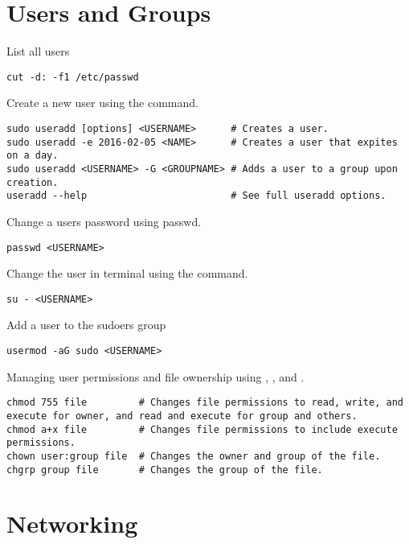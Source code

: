 \section{Users and Groups}

List all users
\begin{lstlisting}
cut -d: -f1 /etc/passwd
\end{lstlisting}

Create a new user using the  command.
\begin{lstlisting}
sudo useradd [options] <USERNAME>      # Creates a user.
sudo useradd -e 2016-02-05 <NAME>      # Creates a user that expites on a day.
sudo useradd <USERNAME> -G <GROUPNAME> # Adds a user to a group upon creation.
useradd --help                         # See full useradd options.
\end{lstlisting}

Change a users password using passwd.
\begin{lstlisting}
passwd <USERNAME>
\end{lstlisting}

Change the user in terminal using the  command.
\begin{lstlisting}
su - <USERNAME>
\end{lstlisting}

Add a user to the sudoers group
\begin{lstlisting}
usermod -aG sudo <USERNAME>
\end{lstlisting}

Managing user permissions and file ownership using , , and .
\begin{lstlisting}
chmod 755 file         # Changes file permissions to read, write, and execute for owner, and read and execute for group and others.
chmod a+x file         # Changes file permissions to include execute permissions.
chown user:group file  # Changes the owner and group of the file.
chgrp group file       # Changes the group of the file.
\end{lstlisting}












\section{Networking}

